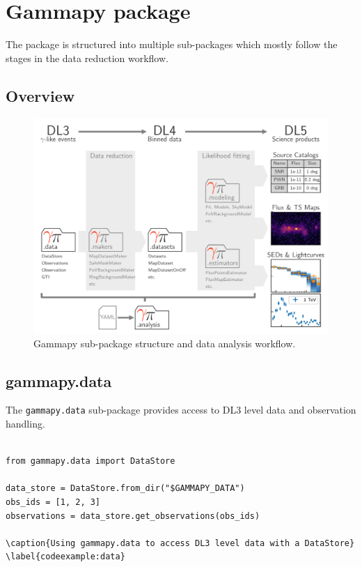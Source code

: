 \section{Gammapy package}
\label{sec:package}

The \gammapy package is structured into multiple sub-packages
which mostly follow the stages in the data reduction workflow.


\subsection{Overview}
\begin{figure}[t]
\centering
\includegraphics[width=1.\textwidth]{static/data-flow-gammapy}
\caption{
Gammapy sub-package structure and data analysis workflow.
}
\label{fig:workflow}
\end{figure}



\subsection{gammapy.data}
The \verb|gammapy.data| sub-package provides access to
DL3 level data and observation handling.


\begin{lstlisting}

from gammapy.data import DataStore

data_store = DataStore.from_dir("$GAMMAPY_DATA")
obs_ids = [1, 2, 3]
observations = data_store.get_observations(obs_ids)

\caption{Using gammapy.data to access DL3 level data with a DataStore}
\label{codeexample:data}
\end{lstlisting}



